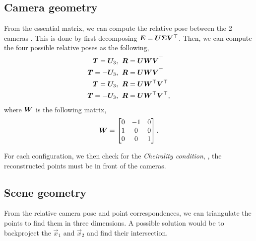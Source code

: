 \subsection{Camera geometry}

From the essential matrix, we can compute the relative pose between the 2 cameras
\citep{longuet1981computer}. This is done by first decomposing $\bm{E} =
\bm{U} \bm{\Sigma} \bm{V}^\top$. Then, we
can compute the four possible relative poses as the following,
\begin{align*}
  \bm{T} = \bm{U}_3,& \hspace{0.2cm} \bm{R} = \bm{U}\bm{W}\bm{V}^\top \\
  \bm{T} = -\bm{U}_3,& \hspace{0.2cm} \bm{R} = \bm{U}\bm{W}\bm{V}^\top \\
  \bm{T} = \bm{U}_3,& \hspace{0.2cm} \bm{R} = \bm{U}\bm{W}^\top\bm{V}^\top \\
  \bm{T} = -\bm{U}_3,& \hspace{0.2cm} \bm{R} = \bm{U}\bm{W}^\top\bm{V}^\top
,\end{align*}
where $\bm{W}$ is the following matrix, \[
  \bm{W} = \begin{bmatrix} 
    0 & -1 & 0 \\
    1 & 0 & 0 \\
    0 & 0 & 1
  \end{bmatrix} 
.\]

For each configuration, we then check for the \textit{Cheirality condition},
\ie, the reconstructed points must be in front of the cameras.

\subsection{Scene geometry}

From the relative camera pose and point correspondences, we can triangulate the
points to find them in three dimensions. A possible solution would be to
backproject the $\vec{x}_1$ and $\vec{x}_2$ and find their intersection.

